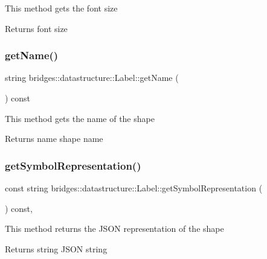 This method gets the font size

\begin{DoxyReturn}{Returns}
font size 
\end{DoxyReturn}
\mbox{\label{classbridges_1_1datastructure_1_1_label_ac2a15e34404b9b7859e658da63a7020f}} 
\subsubsection{\texorpdfstring{get\+Name()}{getName()}}
{\footnotesize\ttfamily string bridges\+::datastructure\+::\+Label\+::get\+Name (\begin{DoxyParamCaption}{ }\end{DoxyParamCaption}) const\hspace{0.3cm}{\ttfamily [inline]}}

This method gets the name of the shape

\begin{DoxyReturn}{Returns}
name shape name 
\end{DoxyReturn}
\mbox{\label{classbridges_1_1datastructure_1_1_label_aa3b7c9e5630ecc8a2534e6db2a220e90}} 
\subsubsection{\texorpdfstring{get\+Symbol\+Representation()}{getSymbolRepresentation()}}
{\footnotesize\ttfamily const string bridges\+::datastructure\+::\+Label\+::get\+Symbol\+Representation (\begin{DoxyParamCaption}{ }\end{DoxyParamCaption}) const\hspace{0.3cm}{\ttfamily [inline]}, {\ttfamily [virtual]}}

This method returns the J\+S\+ON representation of the shape

\begin{DoxyReturn}{Returns}
string J\+S\+ON string 
\end{DoxyReturn}


